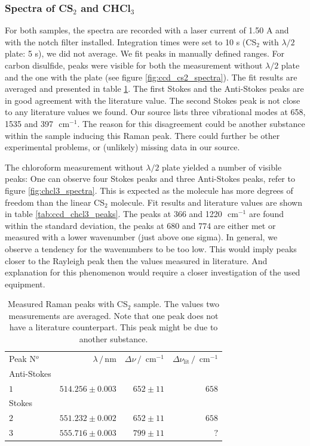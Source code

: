 \subsubsection{Spectra of CS$_2$ and CHCl$_3$}
For both samples, the spectra are recorded with a laser current of 1.50 A and with the notch filter installed. 
Integration times were set to 10 s (CS$_2$ with $\lambda / 2$ plate: 5 s), we did not average. We fit peaks in
manually defined ranges. For carbon disulfide, peaks were visible for both the measurement without $\lambda / 2$ 
plate and the one with the plate (see figure \ref{fig:ccd_cs2_spectra}). The fit results are averaged and presented 
in table \ref{tab:ccd_cs2_peaks}. The first Stokes and the Anti-Stokes peaks are in good agreement with the 
literature value. The second Stokes peak is not close to any literature values we found. Our source lists three
vibrational modes at 658, 1535 and 397 $\text{ cm}^{-1}$. The reason for this disagreement could be another 
substance within the sample inducing this Raman peak. There could further be other experimental problems, or
(unlikely) missing data in our source. 

The chloroform measurement without $\lambda / 2$ plate yielded a number of visible peaks: One can observe 
four Stokes peaks and three Anti-Stokes peaks, refer to figure \ref{fig:chcl3_spectra}. This is expected
as the molecule has more degrees of freedom than the linear CS$_2$ molecule. Fit results and literature 
values are shown in table \ref{tab:ccd_chcl3_peaks}. The peaks at 366 and 1220 $\text{ cm}^{-1} $ are
found within the standard deviation, the peaks at 680 and 774 are either met or measured with a lower wavenumber
(just above one sigma). In general, we observe a tendency for the wavenumbers to be too low. This would imply
peaks closer to the Rayleigh peak then the values measured in literature. And explanation for this phenomenon 
would require a closer investigation of the used equipment. 
\begin{table}[htpb]
    \centering
    \caption{
        Measured Raman peaks with CS$_2$ sample. The values two measurements are averaged. 
        Note that one peak does not have a literature counterpart. This peak might be due to another 
        substance. 
        }
    \label{tab:ccd_cs2_peaks}
    \begin{tabular}{l r r r}
        \rowcolor{LightCyan} Peak N$^o$ & $\lambda \, / \, \text{nm}$ &
        $\Delta \nu \, / \, \text{ cm}^{-1}$ & 
        $\Delta \nu_\text{lit} \, / \, \text{ cm}^{-1}$ \\
        \cellcolor{LightCyan}Anti-Stokes &&& \\
        \cellcolor{LightCyan}$1$ & $514.256 \pm 0.003$ & $652 \pm 11$ & $658$   \\
        \cellcolor{LightCyan}Stokes &&& \\
        \cellcolor{LightCyan}$2$ & $551.232 \pm 0.002$ & $652 \pm 11$ & $658$   \\
        \cellcolor{LightCyan}$3$ & $555.716 \pm 0.003$ & $799 \pm 11$ & $?$  
    \end{tabular}
\end{table}

